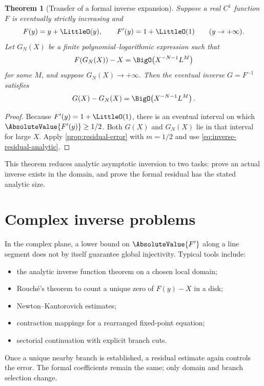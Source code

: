 \documentclass[11pt,openany]{book}
\theoremstyle{definition}
\theoremstyle{plain}
\newtheorem{theorem}{Theorem}[chapter]
\theoremstyle{remark}
\begin{document}
\begin{theorem}[Transfer of a formal inverse expansion]\label{thm:analytic-inverse-transfer}
Suppose a real \(C^1\) function \(F\) is eventually strictly increasing and
\[
 F(y)=y+\LittleO(y),
 \qquad
 F'(y)=1+\LittleO(1)
 \qquad (y\to+\infty).
\]
Let \(G_N(X)\) be a finite polynomial--logarithmic expression such that
\begin{equation}\label{eq:inverse-residual-analytic}
 F(G_N(X))-X
 =\BigO\!\left(X^{-N-1}L^M\right)
\end{equation}
for some \(M\), and suppose \(G_N(X)\to+\infty\).  Then the eventual inverse
\(G=F^{-1}\) satisfies
\begin{equation}\label{eq:inverse-error-transfer}
 G(X)-G_N(X)
 =\BigO\!\left(X^{-N-1}L^M\right).
\end{equation}
\end{theorem}
\begin{proof}
Because \(F'(y)=1+\LittleO(1)\), there is an eventual interval on which
\(\AbsoluteValue{F'(y)}\ge1/2\).  Both \(G(X)\) and \(G_N(X)\) lie in that interval for large
\(X\).  Apply \cref{prop:residual-error} with \(m=1/2\) and use
\cref{eq:inverse-residual-analytic}.
\end{proof}

This theorem reduces analytic asymptotic inversion to two tasks: prove an
actual inverse exists in the domain, and prove the formal residual has the
stated analytic size.

\section{Complex inverse problems}
In the complex plane, a lower bound on \(\AbsoluteValue{F'}\) along a line segment does not by
itself guarantee global injectivity.  Typical tools include:
\begin{itemize}
\item the analytic inverse function theorem on a chosen local domain;
\item Rouché's theorem to count a unique zero of \(F(y)-X\) in a disk;
\item Newton--Kantorovich estimates;
\item contraction mappings for a rearranged fixed-point equation;
\item sectorial continuation with explicit branch cuts.
\end{itemize}
Once a unique nearby branch is established, a residual estimate again controls
the error.  The formal coefficients remain the same; only domain and branch
selection change.
\end{document}
